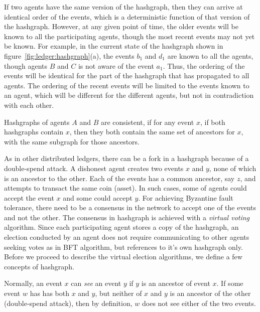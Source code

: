 If two agents have the same version of the hashgraph, then they can arrive at identical order of the events, which is a 
deterministic function of that version of the hashgraph. However, at any given point of time, the older events will be known 
to all the participating agents, though the most recent events may not yet be known. For example, in the current state of 
the hashgraph shown in figure~\ref{fig:ledger:hashgraph}(a), the events $b_1$ and $d_1$ are known to all the agents, 
though agents $B$ and $C$ is not aware of the event $a_1$. Thus, the ordering of the events will be identical for
the part of the hashgraph that has propagated to all agents. The ordering of the recent events will be limited to the events
known to an agent, which will be different for the different agents, but not in contradiction with each other.

\begin{definition} 
	Hashgraphs of agents $A$ and $B$ are consistent, if for any event $x$, if both hashgraphs contain $x$, then they both 
	contain the same set of ancestors for $x$, with the same subgraph for those ancestors.
\end{definition}

As in other distributed ledgers, there can be a fork in a hashgraph because of a double-spend attack. A dishonest agent creates
two events $x$ and $y$, none of which is an ancestor to the other. Each of the events has a common ancestor, say $z$, and attempts 
to transact the same coin (asset). In such cases, some of agents could accept the event $x$ and some could accept $y$.
%
For achieving Byzantine fault tolerance, there need to be a consensus in the network to accept one of the events and not the other. 
The consensus in hashgraph is achieved with a {\em virtual voting} algorithm. Since each participating agent stores a copy of the 
hashgraph, an election conducted by an agent does not require communicating to other agents seeking votes as in BFT algorithm, but 
references to it's own hashgraph only. Before we proceed to describe the virtual election algorithms, we define a few concepts of 
hashgraph.

\begin{definition} [see]
	Normally, an event $x$ can {\em see} an event $y$ if $y$ is an ancestor of event $x$. If some event $w$ has has both $x$ 
	and $y$, but neither of $x$ and $y$ is an ancestor of the other (double-spend attack), then by definition, $w$ does not see 
	either of the two events. 
\end{definition}

